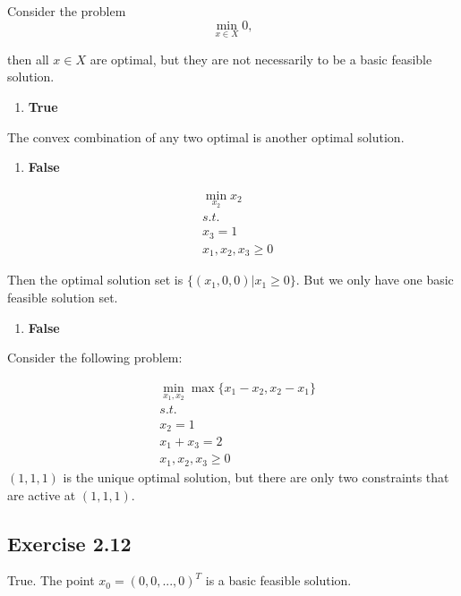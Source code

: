 \documentclass[11pt]{article}
\providecommand{\tightlist}{%
      \setlength{\itemsep}{0pt}\setlength{\parskip}{0pt}}
\begin{document}
Consider the problem \[
\min_{x\in X} 0, 
\]

then all \(x\in X\) are optimal, but they are not necessarily to be a
basic feasible solution.

\begin{enumerate}
\def\labelenumi{\alph{enumi})}
\setcounter{enumi}{3}
\tightlist
\item
  \textbf{True}
\end{enumerate}

The convex combination of any two optimal is another optimal solution.

\begin{enumerate}
\def\labelenumi{\alph{enumi})}
\setcounter{enumi}{4}
\tightlist
\item
  \textbf{False}
\end{enumerate}

\[
\begin{align*}
& \min_{x_2} x_2 \\
& s.t. \\
& x_3 = 1 \\
& x_1, x_2, x_3 \geq 0
\end{align*}
\]

Then the optimal solution set is \(\{(x_1,0,0)|x_1 \geq 0\}\). But we
only have one basic feasible solution set.

\begin{enumerate}
\def\labelenumi{\alph{enumi})}
\setcounter{enumi}{5}
\tightlist
\item
  \textbf{False}
\end{enumerate}

Consider the following problem:

\[
\begin{align*}
& \min_{x_1,x_2} \max\{x_1-x_2, x_2-x_1\} \\
& s.t. \\
& x_2 = 1 \\
& x_1 + x_3 = 2\\
& x_1, x_2, x_3 \geq 0
\end{align*}
\] \((1, 1, 1)\) is the unique optimal solution, but there are only two
constraints that are active at \((1, 1, 1)\).

    \hypertarget{exercise-2.12}{%
\subsection{Exercise 2.12}\label{exercise-2.12}}

True. The point \(x_0=(0,0,...,0)^T\) is a basic feasible solution.
\end{document}
